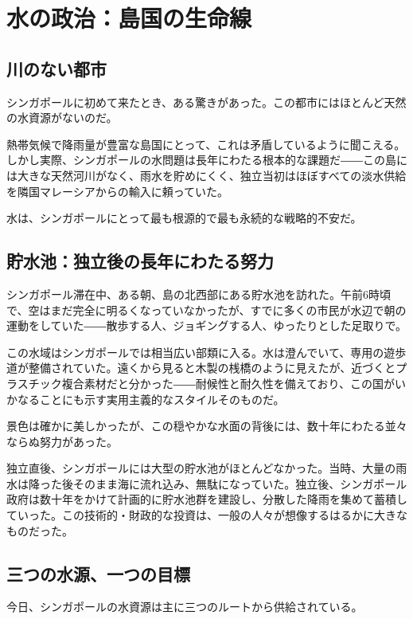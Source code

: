 \chapter{水の政治：島国の生命線}

\section{川のない都市}

シンガポールに初めて来たとき、ある驚きがあった。この都市にはほとんど天然の水資源がないのだ。

熱帯気候で降雨量が豊富な島国にとって、これは矛盾しているように聞こえる。しかし実際、シンガポールの水問題は長年にわたる根本的な課題だ――この島には大きな天然河川がなく、雨水を貯めにくく、独立当初はほぼすべての淡水供給を隣国マレーシアからの輸入に頼っていた。

水は、シンガポールにとって最も根源的で最も永続的な戦略的不安だ。

\section{貯水池：独立後の長年にわたる努力}

シンガポール滞在中、ある朝、島の北西部にある貯水池を訪れた。午前6時頃で、空はまだ完全に明るくなっていなかったが、すでに多くの市民が水辺で朝の運動をしていた――散歩する人、ジョギングする人、ゆったりとした足取りで。

この水域はシンガポールでは相当広い部類に入る。水は澄んでいて、専用の遊歩道が整備されていた。遠くから見ると木製の桟橋のように見えたが、近づくとプラスチック複合素材だと分かった――耐候性と耐久性を備えており、この国がいかなることにも示す実用主義的なスタイルそのものだ。

景色は確かに美しかったが、この穏やかな水面の背後には、数十年にわたる並々ならぬ努力があった。

独立直後、シンガポールには大型の貯水池がほとんどなかった。当時、大量の雨水は降った後そのまま海に流れ込み、無駄になっていた。独立後、シンガポール政府は数十年をかけて計画的に貯水池群を建設し、分散した降雨を集めて蓄積していった。この技術的・財政的な投資は、一般の人々が想像するはるかに大きなものだった。

\section{三つの水源、一つの目標}

今日、シンガポールの水資源は主に三つのルートから供給されている。

